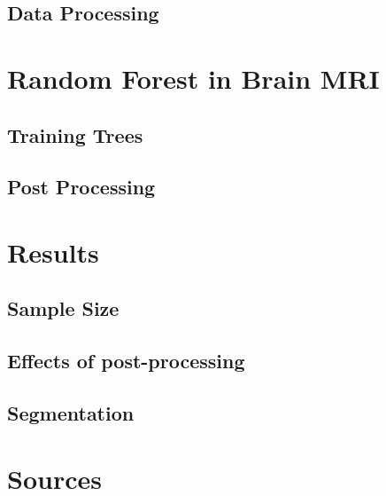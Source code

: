 \documentclass{article}
\begin{document}
 \subsection{Data Processing}

 \section{Random Forest in Brain MRI}
 \subsection{Training Trees}
 \subsection{Post Processing}

 \section{Results}
 \subsection{Sample Size}
 \subsection{Effects of post-processing}
 \subsection{Segmentation}



 \section{Sources}
 
 
\end{document}
